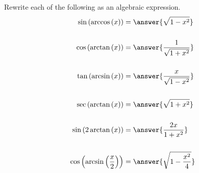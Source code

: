 \documentclass{ximera}
\author{Carl Stitz \and Jeff Zeager \and Bart Snapp \and Matthew Carr \and Bobby Ramsey}
\begin{document}
\begin{exercise}


Rewrite each of the following as an algebraic expression.
 \begin{align*}
	\sin \left( \arccos \left( x \right) \right) &= \answer{\sqrt{1-x^2}}\\ \\
	\cos \left( \arctan \left( x \right) \right) &= \answer{\frac{1}{\sqrt{1+x^2}}} \\ \\ 
	\tan \left( \arcsin \left( x \right) \right) &= \answer{\frac{x}{\sqrt{1-x^2}}} \\ \\ 
	\sec \left( \arctan \left( x \right) \right) &= \answer{\sqrt{1+x^2}} \\ \\ 
	\sin \left( 2\arctan \left( x \right) \right) &= \answer{\frac{2x}{1+x^2}} \\ \\ 
	\cos\left(\arcsin\left(\dfrac{x}{2}\right)\right) &= \answer{\sqrt{1-\frac{x^2}{4}}}
 \end{align*}

\end{exercise}
\end{document}

